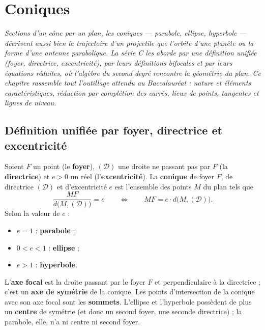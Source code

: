 \chapter{Coniques}

\noindent\textit{Sections d'un cône par un plan, les coniques --- parabole, ellipse,
hyperbole --- décrivent aussi bien la trajectoire d'un projectile que l'orbite d'une
planète ou la forme d'une antenne parabolique. La série C les aborde par une définition
unifiée (foyer, directrice, excentricité), par leurs définitions bifocales et par leurs
équations réduites, où l'algèbre du second degré rencontre la géométrie du plan. Ce
chapitre rassemble tout l'outillage attendu au Baccalauréat : nature et éléments
caractéristiques, réduction par complétion des carrés, lieux de points, tangentes et
lignes de niveau.}
\vspace{8pt}

\section{Définition unifiée par foyer, directrice et excentricité}

\begin{definition}
Soient $F$ un point (le \textbf{foyer}), $(\mathcal D)$ une droite ne passant pas par $F$
(la \textbf{directrice}) et $e>0$ un réel (l'\textbf{excentricité}). La \textbf{conique}
de foyer $F$, de directrice $(\mathcal D)$ et d'excentricité $e$ est l'ensemble des points
$M$ du plan tels que
\[
\frac{MF}{d\big(M,(\mathcal D)\big)}=e
\qquad\Longleftrightarrow\qquad
MF=e\cdot d\big(M,(\mathcal D)\big).
\]
Selon la valeur de $e$ :
\begin{itemize}
\item $e=1$ : \textbf{parabole} ;
\item $0<e<1$ : \textbf{ellipse} ;
\item $e>1$ : \textbf{hyperbole}.
\end{itemize}
\end{definition}

\begin{definition}
L'\textbf{axe focal} est la droite passant par le foyer $F$ et perpendiculaire à la
directrice ; c'est un \textbf{axe de symétrie} de la conique. Les points d'intersection de
la conique avec son axe focal sont les \textbf{sommets}. L'ellipse et l'hyperbole possèdent
de plus un \textbf{centre} de symétrie (et donc un second foyer, une seconde directrice) ;
la parabole, elle, n'a ni centre ni second foyer.
\end{definition}

